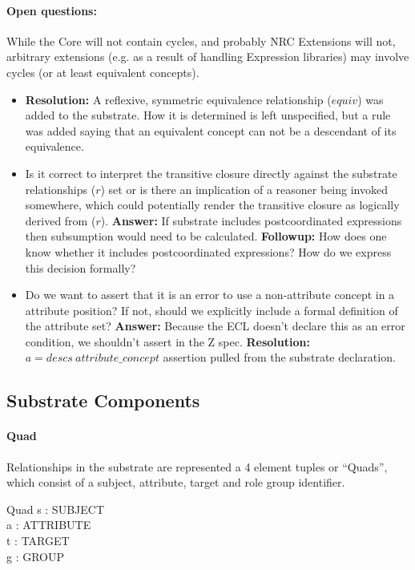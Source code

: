\documentclass{article}
\begin{document}
\paragraph{Open questions:}
While the Core will not contain cycles, and probably NRC Extensions will not, arbitrary extensions (e.g. as a result of handling Expression libraries) may involve cycles (or at least equivalent concepts).
\begin{itemize}
\item \textbf{Resolution: } A reflexive, symmetric equivalence relationship ($equiv$) was added to the substrate.  How it is determined is left unspecified, but a rule was added saying that an equivalent concept can not be a descendant of its equivalence.
\item Is it correct to interpret the transitive closure directly against the substrate relationships ($r$) set or is there an implication of a reasoner being invoked somewhere, which 
could potentially render the transitive closure as logically derived from ($r$).  \textbf{Answer: } If substrate includes postcoordinated expressions then subsumption would need to be calculated. \textbf{Followup: } How does one know whether it includes postcoordinated expressions?  How do we express this decision formally?
\item Do we want to assert that it is an error to use a non-attribute concept in a attribute position?  If not, should we explicitly include a formal definition of the attribute set? \textbf{Answer: }  Because the ECL doesn't declare this as an error condition, we shouldn't assert in the Z spec.  \textbf{Resolution: } $   a = descs~attribute\_concept $ assertion pulled from the substrate declaration.
\end{itemize}
\subsection{Substrate Components}
\paragraph{Quad}
Relationships in the substrate are represented a 4 element tuples or ``Quads'', which consist of a subject, attribute, target and role group identifier.

\begin{schema}{Quad}
   s : SUBJECT \\
   a : ATTRIBUTE \\
   t : TARGET \\
   g : GROUP
\end{schema}
\end{document}
